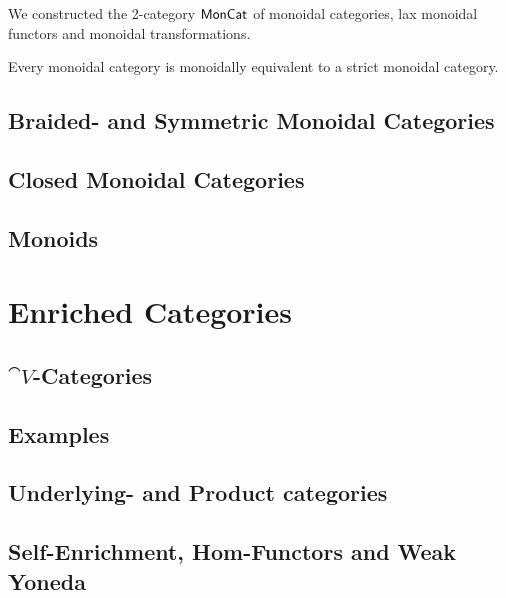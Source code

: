 	\begin{definition}
		We constructed the 2-category $\textsf{MonCat}$ of monoidal categories, lax monoidal functors and monoidal transformations.
	\end{definition}

	\begin{theorem}
		Every monoidal category is monoidally equivalent to a strict monoidal category.
	\end{theorem}

	\subsection{Braided- and Symmetric Monoidal Categories}
	\subsection{Closed Monoidal Categories}
	\subsection{Monoids}
	\newpage
	\section{Enriched Categories}
	\subsection{$\cat{V}$-Categories}
	\subsection{Examples}
	\subsection{Underlying- and Product categories}
	\subsection{Self-Enrichment, Hom-Functors and Weak Yoneda}
